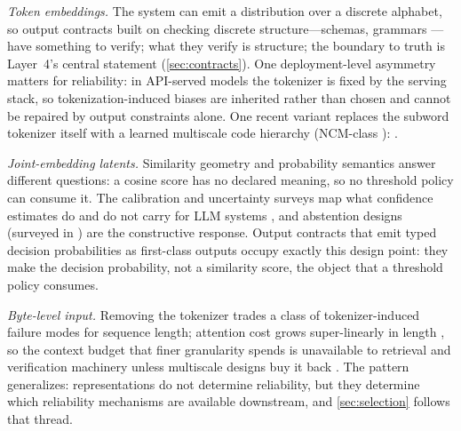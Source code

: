 \emph{Token embeddings.} The system can emit a distribution over a discrete alphabet, so output
contracts built on checking discrete structure---schemas, grammars
\cite{jsonschemabench2025,xgrammar2024}---have something to verify; what they verify is structure;
the boundary to truth is Layer~4's central statement (\cref{sec:contracts}). One
deployment-level asymmetry matters for reliability: in API-served models the tokenizer is fixed
by the serving stack, so tokenization-induced biases are inherited rather than chosen and cannot
be repaired by output constraints alone. One recent variant replaces the subword tokenizer
itself with a learned multiscale code hierarchy (NCM-class \cite{kumbong2026ncm}):
. 

\emph{Joint-embedding latents.} Similarity geometry and probability semantics answer different
questions: a cosine score has no declared meaning, so no threshold policy can consume it.
 The calibration and uncertainty surveys map what
confidence estimates do and do not carry for LLM systems \cite{id231108298,id250315850},
and abstention designs (surveyed in \cite{id240718418}) are the constructive response. Output
contracts that emit typed decision probabilities as first-class outputs
\cite{rauk2026jevbenchmark} occupy exactly this design point: they make the decision probability,
not a similarity score, the object that a threshold policy consumes.

\emph{Byte-level input.} Removing the tokenizer trades a class of tokenizer-induced failure modes
for sequence length; attention cost grows super-linearly in length \cite{vaswani2017attention},
so the context budget that finer granularity spends is unavailable to retrieval and verification
machinery unless multiscale designs buy it back \cite{id230507185}. The pattern generalizes:
representations do not determine reliability, but they determine which reliability mechanisms are
available downstream, and \cref{sec:selection} follows that thread.

